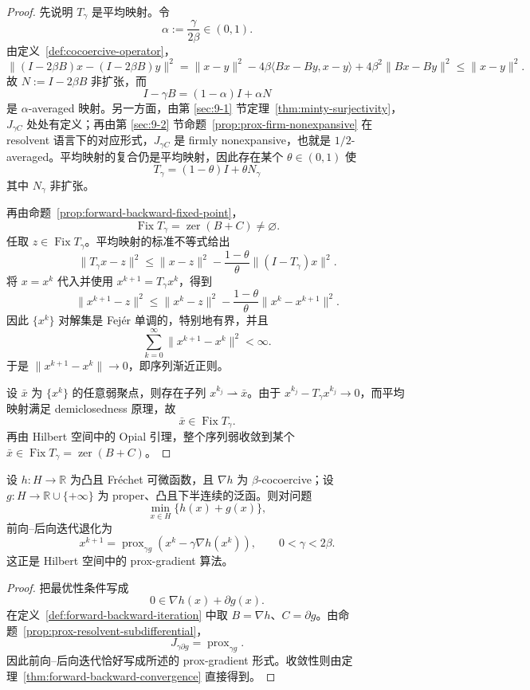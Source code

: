 \begin{proof}
先说明 $T_\gamma$ 是平均映射。令
\[
\alpha:=\frac{\gamma}{2\beta}\in(0,1).
\]
由定义~\ref{def:cocoercive-operator}，
\[
\|(I-2\beta B)x-(I-2\beta B)y\|^2
=
\|x-y\|^2-4\beta\langle Bx-By,x-y\rangle+4\beta^2\|Bx-By\|^2
\le \|x-y\|^2.
\]
故 $N:=I-2\beta B$ 非扩张，而
\[
I-\gamma B=(1-\alpha)I+\alpha N
\]
是 $\alpha$-averaged 映射。另一方面，由第 \ref{sec:9-1} 节定理~\ref{thm:minty-surjectivity}，$J_{\gamma C}$ 处处有定义；再由第 \ref{sec:9-2} 节命题~\ref{prop:prox-firm-nonexpansive} 在 resolvent 语言下的对应形式，$J_{\gamma C}$ 是 firmly nonexpansive，也就是 $1/2$-averaged。平均映射的复合仍是平均映射，因此存在某个 $\theta\in(0,1)$ 使
\[
T_\gamma=(1-\theta)I+\theta N_\gamma
\]
其中 $N_\gamma$ 非扩张。

再由命题~\ref{prop:forward-backward-fixed-point}，
\[
\operatorname{Fix}T_\gamma=\operatorname{zer}(B+C)\neq\varnothing.
\]
任取 $z\in \operatorname{Fix}T_\gamma$。平均映射的标准不等式给出
\[
\|T_\gamma x-z\|^2
\le
\|x-z\|^2-\frac{1-\theta}{\theta}\|(I-T_\gamma)x\|^2.
\]
将 $x=x^k$ 代入并使用 $x^{k+1}=T_\gamma x^k$，得到
\[
\|x^{k+1}-z\|^2
\le
\|x^k-z\|^2-\frac{1-\theta}{\theta}\|x^k-x^{k+1}\|^2.
\]
因此 $\{x^k\}$ 对解集是 Fej\'er 单调的，特别地有界，并且
\[
\sum_{k=0}^\infty \|x^{k+1}-x^k\|^2<\infty.
\]
于是 $\|x^{k+1}-x^k\|\to 0$，即序列渐近正则。

设 $\bar x$ 为 $\{x^k\}$ 的任意弱聚点，则存在子列 $x^{k_j}\rightharpoonup \bar x$。由于 $x^{k_j}-T_\gamma x^{k_j}\to 0$，而平均映射满足 demiclosedness 原理，故
\[
\bar x\in \operatorname{Fix}T_\gamma.
\]
再由 Hilbert 空间中的 Opial 引理，整个序列弱收敛到某个 $\bar x\in \operatorname{Fix}T_\gamma=\operatorname{zer}(B+C)$。
\end{proof}

\begin{corollary}\label{cor:prox-gradient-specialization}
设 $h\colon H\to \mathbb R$ 为凸且 Fr\'echet 可微函数，且 $\nabla h$ 为 $\beta$-cocoercive；设 $g\colon H\to \mathbb R\cup\{+\infty\}$ 为 proper、凸且下半连续的泛函。则对问题
\[
\min_{x\in H}\{h(x)+g(x)\},
\]
前向--后向迭代退化为
\[
x^{k+1}
=
\operatorname{prox}_{\gamma g}(x^k-\gamma \nabla h(x^k)),
\qquad 0<\gamma<2\beta.
\]
这正是 Hilbert 空间中的 prox-gradient 算法。
\end{corollary}

\begin{proof}
把最优性条件写成
\[
0\in \nabla h(x)+\partial g(x).
\]
在定义~\ref{def:forward-backward-iteration} 中取 $B=\nabla h$、$C=\partial g$。由命题~\ref{prop:prox-resolvent-subdifferential}，
\[
J_{\gamma\partial g}=\operatorname{prox}_{\gamma g}.
\]
因此前向--后向迭代恰好写成所述的 prox-gradient 形式。收敛性则由定理~\ref{thm:forward-backward-convergence} 直接得到。
\end{proof}


